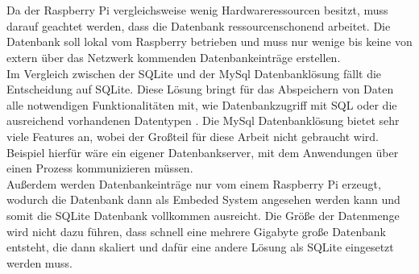 \\\\Da der Raspberry Pi vergleichsweise wenig Hardwareressourcen besitzt, muss darauf geachtet werden, dass die Datenbank ressourcenschonend arbeitet. Die Datenbank soll lokal vom Raspberry betrieben und muss nur wenige bis keine von extern über das Netzwerk kommenden Datenbankeinträge erstellen.\\Im Vergleich zwischen der SQLite und der MySql Datenbanklösung fällt die Entscheidung auf SQLite. Diese Lösung bringt für das Abspeichern von Daten alle notwendigen Funktionalitäten mit, wie Datenbankzugriff mit \acf{SQL} oder die ausreichend vorhandenen Datentypen \cite{sqlite:sqlite2}. Die MySql Datenbanklösung bietet sehr viele Features an, wobei der Großteil für diese Arbeit nicht gebraucht wird. Beispiel hierfür wäre ein eigener Datenbankserver, mit dem Anwendungen über einen Prozess kommunizieren müssen. \\Außerdem werden Datenbankeinträge nur vom einem Raspberry Pi erzeugt, wodurch die Datenbank dann als Embeded System angesehen werden kann und somit die SQLite Datenbank vollkommen ausreicht. Die Größe der Datenmenge wird nicht dazu führen, dass schnell eine mehrere Gigabyte große Datenbank entsteht, die dann skaliert  und dafür eine andere Lösung als SQLite eingesetzt werden muss.\cite{sqlite:sqlite}


